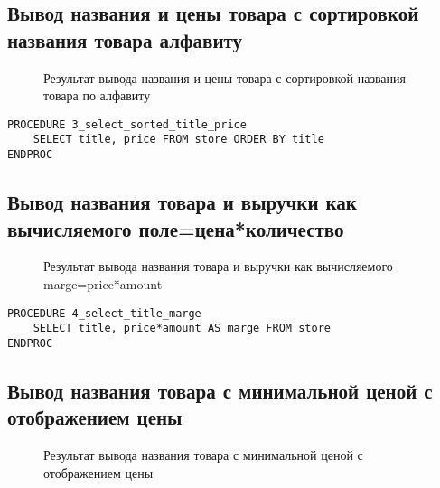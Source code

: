 \subsection{Вывод названия и цены товара с сортировкой названия товара алфавиту}

\begin{figure}[h!t]
  \caption{Результат вывода названия и цены товара с сортировкой названия товара по алфавиту}
\end{figure}

\begin{lstlisting}[float,caption=Source code]
PROCEDURE 3_select_sorted_title_price
	SELECT title, price FROM store ORDER BY title
ENDPROC
\end{lstlisting}

\subsection{Вывод названия товара и выручки как вычисляемого поле=цена*количество}

\begin{figure}[h!t]
  \caption{Результат вывода названия товара и выручки как вычисляемого marge=price*amount}
\end{figure}

\begin{lstlisting}[float,caption=Source code]
PROCEDURE 4_select_title_marge
	SELECT title, price*amount AS marge FROM store
ENDPROC
\end{lstlisting}

\subsection{Вывод названия товара с минимальной ценой с отображением цены}

\begin{figure}[h!t]
  \caption{Результат вывода названия товара с минимальной ценой с отображением цены}
\end{figure}

